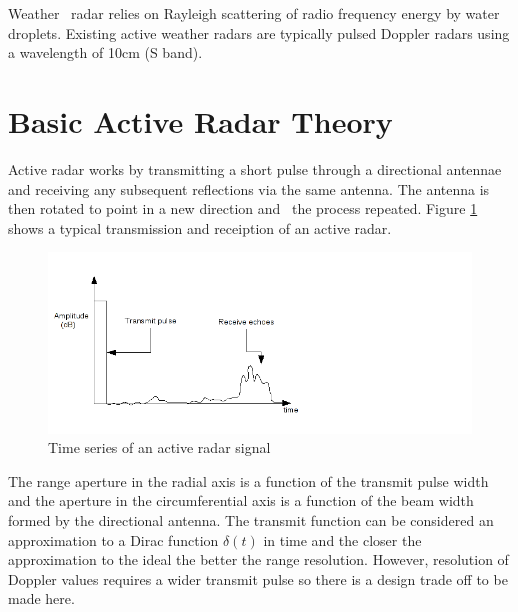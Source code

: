 \documentclass[a4paper]{report}
\numberwithin{equation}{chapter}
\begin{document}
\bigskip

Weather \ radar relies on Rayleigh scattering of radio frequency energy
by water droplets. Existing active weather radars are typically pulsed
Doppler radars using a wavelength of 10cm (S band).

\section{Basic Active Radar Theory}
Active radar works by transmitting a short pulse through a directional
antennae and receiving any subsequent reflections via the same antenna.
The antenna is then rotated to point in a new direction and \ the
process repeated. Figure \ref{fig:01} shows a typical transmission and receiption of an active radar.

\begin{figure}
\centering 
\includegraphics{Passive-Weather-Radar-Theory-fig-01.png}
\caption[Time series of an active radar signal]{Time series of an active radar signal}
\label{fig:01}
\end{figure}

\bigskip

The range aperture in the radial axis is a function of the transmit pulse
width and the aperture in the circumferential axis is a function of the
beam width formed by the directional antenna. The transmit function can be considered an approximation to a Dirac function $\delta(t)$ in time and the closer the approximation to the ideal the better the range resolution. However, resolution of Doppler values requires a wider transmit pulse so there is a design trade off to be made here. 
\end{document}

